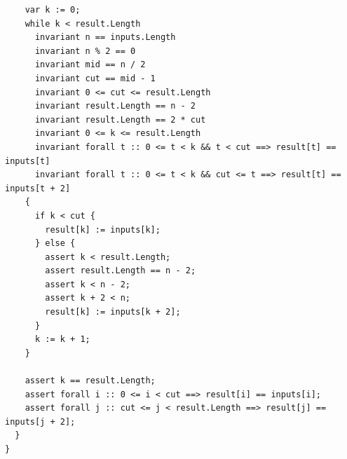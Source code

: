 \documentclass{article}
\begin{document}
\begin{lstlisting}
    var k := 0;
    while k < result.Length
      invariant n == inputs.Length
      invariant n % 2 == 0
      invariant mid == n / 2
      invariant cut == mid - 1
      invariant 0 <= cut <= result.Length
      invariant result.Length == n - 2
      invariant result.Length == 2 * cut
      invariant 0 <= k <= result.Length
      invariant forall t :: 0 <= t < k && t < cut ==> result[t] == inputs[t]
      invariant forall t :: 0 <= t < k && cut <= t ==> result[t] == inputs[t + 2]
    {
      if k < cut {
        result[k] := inputs[k];
      } else {
        assert k < result.Length;
        assert result.Length == n - 2;
        assert k < n - 2;
        assert k + 2 < n;
        result[k] := inputs[k + 2];
      }
      k := k + 1;
    }

    assert k == result.Length;
    assert forall i :: 0 <= i < cut ==> result[i] == inputs[i];
    assert forall j :: cut <= j < result.Length ==> result[j] == inputs[j + 2];
  }
}
\end{lstlisting}
\end{document}
